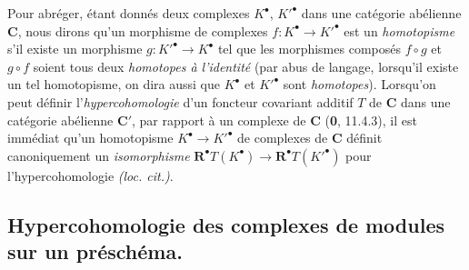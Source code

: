 \begin{env}[6.1.4]
Pour abréger, étant donnés deux complexes $K^\bullet$, $K'^\bullet$ dans une
catégorie abélienne $\boldsymbol{C}$, nous dirons qu'un morphisme de complexes
$f:K^\bullet\to K'^\bullet$ est un \emph{homotopisme} s'il existe un morphisme
$g:K'^\bullet\to K^\bullet$ tel que les morphismes composés $f\circ g$ et
$g\circ f$ soient tous deux \emph{homotopes à l'identité} (par abus de langage,
lorsqu'il existe un tel homotopisme, on dira aussi que $K^\bullet$ et
$K'^\bullet$ sont \emph{homotopes}). Lorsqu'on peut définir l'\emph{hypercohomologie} d'un
foncteur covariant additif $T$ de $\boldsymbol{C}$ dans une catégorie abélienne $\boldsymbol{C}'$, par
rapport à un complexe de $\boldsymbol{C}$ (\textbf{0}, 11.4.3), il est immédiat qu'un homotopisme
$K^\bullet\to K'^\bullet$ de complexes de $\boldsymbol{C}$ définit canoniquement un
\emph{isomorphisme}
$\mathbf R^\bullet T(K^\bullet)\to\mathbf R^\bullet T(K'^\bullet)$
pour l'hypercohomologie \emph{(loc. cit.)}.
\end{env}

\subsection{Hypercohomologie des complexes de modules sur un préschéma.}
\label{subsection:III.6.2.fr}

